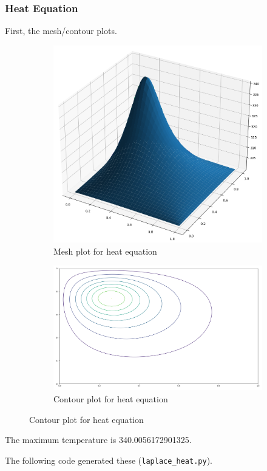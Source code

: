 \documentclass[boxes,pages]{homework}
\begin{document}
\begin{solution}
	\subsubsection*{Heat Equation}
	First, the mesh/contour plots.
	\begin{figure}[h]
		\centering
		\begin{subfigure}{.5\textwidth}
			\centering
			\includegraphics[width=.9\linewidth]{problemThree/heat_mesh.png}
			\caption{Mesh plot for heat equation}
			\label{fig:sub1}
		\end{subfigure}%
		\begin{subfigure}{.5\textwidth}
			\centering
			\includegraphics[width=.9\linewidth]{problemThree/heat_contour.png}
			\caption{Contour plot for heat equation}
			\label{fig:sub2}
		\end{subfigure}
	\end{figure}
	The maximum temperature is 340.0056172901325.

	The following code generated these (\verb+laplace_heat.py+).
	

\end{solution}
\end{document}
